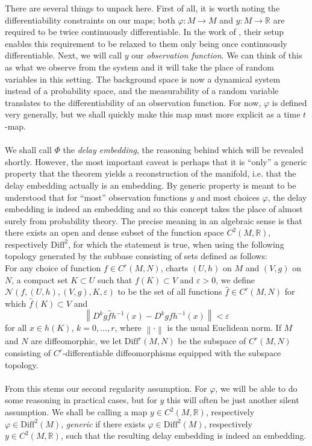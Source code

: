 \documentclass[11pt, a4paper]{memoir}
\theoremstyle{break}
\theoremstyle{break}
\theoremstyle{nonumberplain}
\newcommand{\mR}{\mathbb{R}}
\newcommand{\norm}[1]{\left\lVert#1\right\rVert}
\begin{document}
There are several things to unpack here. First of all, it is worth noting the differentiability constraints on our maps; both $\varphi: M\to M$ and $y:M\to\mR$ are required to be twice continuously differentiable. In the work of \cite{Sauer1991}, their setup enables this requirement to be relaxed to them only being once continuously differentiable. Next, we will call $y$ our \textit{observation function}. We can think of this as what we observe from the system and it will take the place of random variables in this setting. The background space is now a dynamical system instead of a probability space, and the measurability   of a random variable translates to the differentiability of an observation function. For now, $\varphi$ is defined very generally, but we shall quickly make this map must more explicit as a time $t$-map.\\\\
We shall call $\Phi$ the \textit{delay embedding}, the reasoning behind which will be revealed shortly. However, the most important caveat is perhaps that it is \enquote{only} a generic property that the theorem yields a reconstruction of the manifold, i.e. that the delay embedding actually is an embedding. By generic property is meant to be understood that for \enquote{most} observation functions $y$ and most choices $\varphi$, the delay embedding is indeed an embedding and so this concept takes the place of almost surely from probability theory. The precise meaning in an algebraic sense is that there exists an open and dense subset of the function space $C^2(M,\mR)$, respectively $\text{Diff}^2$, for which the statement is true, when using the following topology generated by the subbase consisting of sets defined as follows:\\[5pt]
For any choice of function $f\in C^r(M,N)$, charts $(U,h)$ on $M$ and $(V,g)$ on $N$, a compact set $K\subset U$ such that $f(K)\subset V$ and $\varepsilon>0$, we define $\mathcal{N}(f,(U,h),(V,g),K,\varepsilon)$ to be the set of all functions $\hat{f}\in C^r(M,N)$ for which $\hat{f}(K)\subset V$ and
$$\norm{D^kg\hat{f}h^{-1}(x)-D^kgfh^{-1}(x)}<\varepsilon$$
for all $x\in h(K)$, $k=0,\ldots,r$, where $\norm{\cdot}$ is the usual Euclidean norm. If $M$ and $N$ are diffeomorphic, we let $\text{Diff}^r(M,N)$ be the subspace of $C^r(M,N)$ consisting of $C^r$-differentiable diffeomorphisms equipped with the subspace topology.\\\\
From this stems our second regularity assumption. For $\varphi$, we will be able to do some reasoning in practical cases, but for $y$ this will often be just another silent assumption. We shall be calling a map $y\in C^2(M,\mR)$, respectively $\varphi\in \text{Diff}^2(M)$, \textit{generic} if there exists $\varphi\in \text{Diff}^2(M)$, respectively $y\in C^2(M,\mR)$, such that the resulting delay embedding is indeed an embedding.
\end{document}
